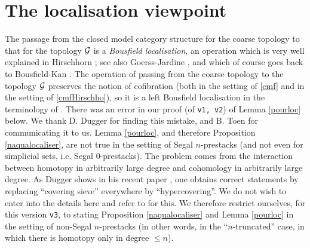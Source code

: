 
\clearpage
\section{The localisation viewpoint}
\label{localisationpage}


The passage from the closed model category structure for the coarse topology
to that for the topology ${\cal G}$ is a \emph{Bousfield localisation}, an operation
which is very well explained in Hirschhorn \cite{Hirschhorn}; see also
Goerss-Jardine \cite{JardineGoerssLoc}, and which of course goes back to
Bousfield-Kan \cite{BousfieldKan}. The operation of passing from the coarse
topology to the topology ${\cal G}$ preserves the notion of cofibration (both in the
setting of \ref{cmf} and in the setting of \ref{cmfHirschho}), so it is a left
Bousfield localisation in the terminology of \cite{Hirschhorn}.
There was an error in our proof (of {\tt v1, v2}) of Lemma \ref{pourloc}
below. We thank D. Dugger for finding this mistake, and B. Toen for
communicating it to us. Lemma \ref{pourloc}, and therefore
Proposition \ref{naqualocaliser}, are not true in the setting of Segal
$n$-prestacks (and not even for simplicial sets, i.e. Segal $0$-prestacks). The
problem comes from the interaction between homotopy in arbitrarily large degree
and cohomology in arbitrarily large degree. As Dugger shows in his recent paper
\cite{Dugger}, one obtains correct statements by replacing ``covering sieve''
everywhere by ``hypercovering''. We do not wish to enter into the details here
and refer to \cite{Dugger} for this. We therefore restrict ourselves, for this
version {\tt v3}, to stating Proposition \ref{naqualocaliser} and
Lemma \ref{pourloc} in the setting of non-Segal $n$-prestacks (in other words,
in the ``$n$-truncated'' case, in which there is homotopy only in degree
$\leq n$).

